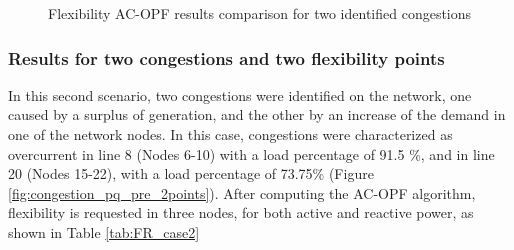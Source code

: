 \begin{figure}[htbp]
\centering     %
{}
\caption{Flexibility AC-OPF results comparison for two identified congestions}
\label{fig:case2_fr}
\end{figure}


\subsubsection{Results for two congestions and two flexibility points}

In this second scenario, two congestions were identified on the network, one caused by a surplus of generation, and the other by an increase of the demand in one of the network nodes. In this case, congestions were characterized as overcurrent in line 8 (Nodes 6-10) with a load percentage of 91.5 \%, and in line 20 (Nodes 15-22), with a load percentage of 73.75\% (Figure \ref{fig:congestion_pq_pre_2points}). After computing the AC-OPF algorithm, flexibility is requested in three nodes, for both active and reactive power, as shown in Table \ref{tab:FR_case2}

